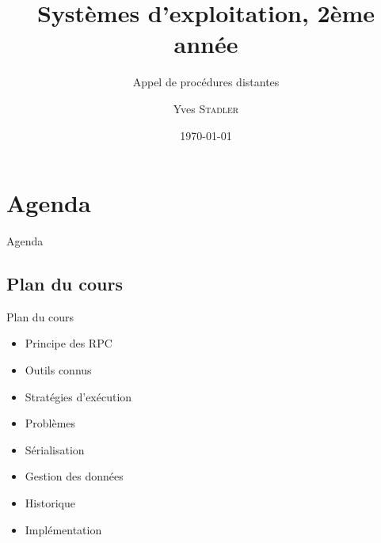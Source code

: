 \title{Systèmes d'exploitation, 2ème année}
\subtitle{Appel de procédures distantes}

\author{Yves \textsc{Stadler}}

\date{\today}



\begin{frame}
\titlepage
\end{frame}

\def\sectitle{Agenda}
\section{\sectitle}
\begin{frame}{\sectitle}
    \def\subsectitle{Plan du cours}
    \subsection{\subsectitle}
    \begin{block}{\subsectitle}
        \begin{itemize}
            \item Principe des RPC
            \item Outils connus
            \item Stratégies d'exécution
            \item Problèmes
            \item Sérialisation
            \item Gestion des données
            \item Historique
            \item Implémentation
        \end{itemize}
    \end{block}
\end{frame}

\def\sectitle{Principe des RPC}
